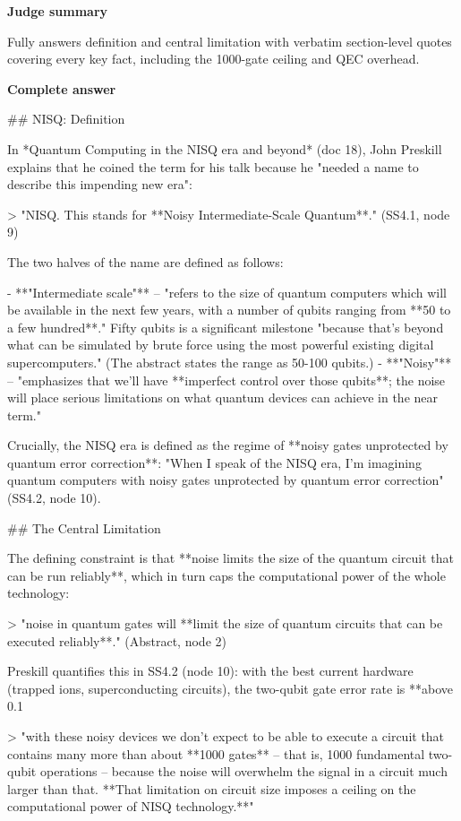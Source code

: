 \documentclass[10pt]{article}
\begin{document}
\textbf{Judge summary}
\begin{EvidenceText}
Fully answers definition and central limitation with verbatim section-level quotes covering every key fact, including the 1000-gate ceiling and QEC overhead.
\end{EvidenceText}

\textbf{Complete answer}
\begin{AnswerText}
## NISQ: Definition

In *Quantum Computing in the NISQ era and beyond* (doc 18), John Preskill explains that he coined the term for his talk because he "needed a name to describe this impending new era":

> "NISQ. This stands for **Noisy Intermediate-Scale Quantum**." (SS4.1, node 9)

The two halves of the name are defined as follows:

- **"Intermediate scale"** -- "refers to the size of quantum computers which will be available in the next few years, with a number of qubits ranging from **50 to a few hundred**." Fifty qubits is a significant milestone "because that's beyond what can be simulated by brute force using the most powerful existing digital supercomputers." (The abstract states the range as 50-100 qubits.)
- **"Noisy"** -- "emphasizes that we'll have **imperfect control over those qubits**; the noise will place serious limitations on what quantum devices can achieve in the near term."

Crucially, the NISQ era is defined as the regime of **noisy gates unprotected by quantum error correction**: "When I speak of the NISQ era, I'm imagining quantum computers with noisy gates unprotected by quantum error correction" (SS4.2, node 10).

## The Central Limitation

The defining constraint is that **noise limits the size of the quantum circuit that can be run reliably**, which in turn caps the computational power of the whole technology:

> "noise in quantum gates will **limit the size of quantum circuits that can be executed reliably**." (Abstract, node 2)

Preskill quantifies this in SS4.2 (node 10): with the best current hardware (trapped ions, superconducting circuits), the two-qubit gate error rate is **above 0.1%

> "with these noisy devices we don't expect to be able to execute a circuit that contains many more than about **1000 gates** -- that is, 1000 fundamental two-qubit operations -- because the noise will overwhelm the signal in a circuit much larger than that. **That limitation on circuit size imposes a ceiling on the computational power of NISQ technology.**"


\end{AnswerText}
\end{document}
